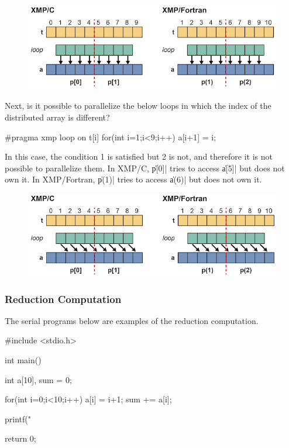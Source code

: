 \begin{figure}
  \centering
  \includegraphics[width=\textwidth]{figs/loop2.png}
\end{figure}

Next, is it possible to parallelize the below loops in which the index
of the distributed array is different?

\begin{XCexample}
#pragma xmp loop on t[i]
  for(int i=1;i<9;i++)
    a[i+1] = i;
\end{XCexample}


In this case, the condition 1 is satisfied but 2 is not, and therefore
it is not possible to parallelize them. In XMP/C, \|p[0]| tries to access
\|a[5]| but does not own it. In XMP/Fortran, \|p(1)| tries to access
\|a(6)| but does not own it.

\begin{figure}
  \centering
  \includegraphics[width=\textwidth]{figs/loop3.png}
\end{figure}


\subsubsection{Reduction Computation}

The serial programs below are examples of the reduction computation.

\begin{Cexample}
#include <stdio.h>

int main(){
  int a[10], sum = 0;

  for(int i=0;i<10;i++){
    a[i] = i+1;
    sum += a[i];
  }

  printf("%

  return 0;
}
\end{Cexample}

